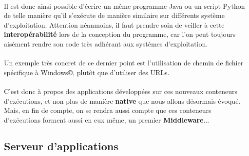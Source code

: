 {\paragraph{} Il est donc ainsi possible d'écrire un même programme Java ou un script Python de telle
manière qu'il s'exécute de manière similaire sur différents système d'exploitation. Attention
néanmoins, il faut prendre soin de veiller à cette \textbf{interopérabilité} lors de la conception
du programme, car l'on peut toujours aisément rendre son code très adhérant aux systèmes
d'exploitation.

\paragraph{} Un exemple très concret de ce dernier point est l'utilisation de chemin de fichier
spécifique à Windows©, plutôt que d'utiliser des URLs.


\paragraph{} C'est donc à propos des applications développées sur ces nouveaux conteneurs
d'exécutions, et non plus de manière \textbf{native} que nous allons désormais évoqué. Mais, en fin
de compte, on se rendra aussi compte que ces conteneurs d'exécutions forment aussi en eux même, un
premier \textbf{Middleware}...

}

\subsection{Serveur d'applications}

